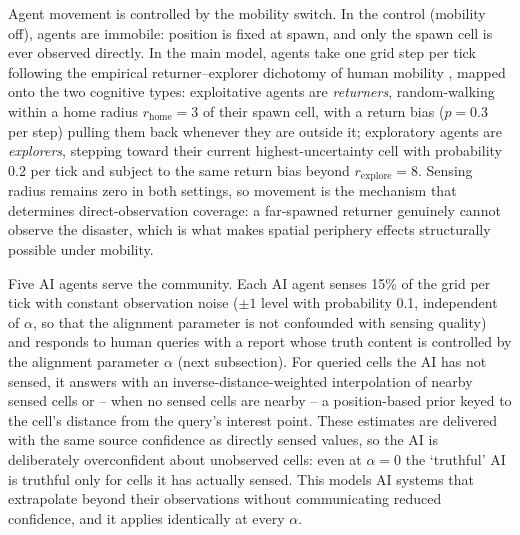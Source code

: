 \documentclass[pdflatex,sn-basic]{sn-jnl}
\begin{document}
Agent movement is controlled by the mobility switch. In the control (mobility off), agents are immobile: position is fixed at spawn, and only the spawn cell is ever observed directly. In the main model, agents take one grid step per tick following the empirical returner--explorer dichotomy of human mobility \citep{pappalardo2015returners}, mapped onto the two cognitive types: exploitative agents are \emph{returners}, random-walking within a home radius $r_{\text{home}} = 3$ of their spawn cell, with a return bias ($p = 0.3$ per step) pulling them back whenever they are outside it; exploratory agents are \emph{explorers}, stepping toward their current highest-uncertainty cell with probability 0.2 per tick and subject to the same return bias beyond $r_{\text{explore}} = 8$. Sensing radius remains zero in both settings, so movement is the mechanism that determines direct-observation coverage: a far-spawned returner genuinely cannot observe the disaster, which is what makes spatial periphery effects structurally possible under mobility.

Five AI agents serve the community. Each AI agent senses 15\% of the grid per tick with constant observation noise ($\pm 1$ level with probability 0.1, independent of $\alpha$, so that the alignment parameter is not confounded with sensing quality) and responds to human queries with a report whose truth content is controlled by the alignment parameter $\alpha$ (next subsection). For queried cells the AI has not sensed, it answers with an inverse-distance-weighted interpolation of nearby sensed cells or -- when no sensed cells are nearby -- a position-based prior keyed to the cell's distance from the query's interest point. These estimates are delivered with the same source confidence as directly sensed values, so the AI is deliberately overconfident about unobserved cells: even at $\alpha = 0$ the `truthful' AI is truthful only for cells it has actually sensed. This models AI systems that extrapolate beyond their observations without communicating reduced confidence, and it applies identically at every $\alpha$.
\end{document}
